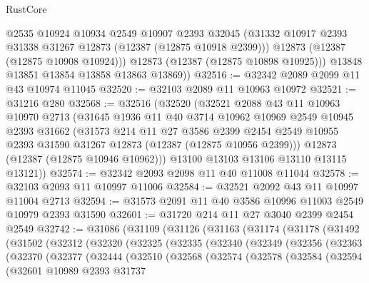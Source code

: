 \begin{lexlean}{RustCore}
\begin{coremodule}
            @2535
            @10924
            @10934
            @2549
            @10907
            @2393
            @32045
            (@31332 @10917 @2393 @31338 @31267 @12873 (@12387 (@12875 @10918 @2399)))
            @12873
            (@12387 (@12875 @10908 @10924)))
          @12873
          (@12387 (@12875 @10898 @10925)))
        @13848
        @13851
        @13854
        @13858
        @13863
        @13869))
@32516 := @32342 @2089 @2099 @11 @43 @10974 @11045
@32520 := @32103 @2089 @11 @10963 @10972
@32521 := @31216 @280
@32568 := @32516
    (@32520
      (@32521
        @2088
        @43
        @11
        @10963
        @10970
        @2713
        (@31645
          @1936
          @11
          @40
          @3714
          @10962
          @10969
          @2549
          @10945
          @2393
          @31662
          (@31573
            @214
            @11
            @27
            @3586
            @2399
            @2454
            @2549
            @10955
            @2393
            @31590
            @31267
            @12873
            (@12387 (@12875 @10956 @2399)))
          @12873
          (@12387 (@12875 @10946 @10962)))
        @13100
        @13103
        @13106
        @13110
        @13115
        @13121))
@32574 := @32342 @2093 @2098 @11 @40 @11008 @11044
@32578 := @32103 @2093 @11 @10997 @11006
@32584 := @32521 @2092 @43 @11 @10997 @11004 @2713
@32594 := @31573 @2091 @11 @40 @3586 @10996 @11003 @2549 @10979 @2393 @31590
@32601 := @31720 @214 @11 @27 @3040 @2399 @2454 @2549
@32742 := @31086
    (@31109
      (@31126
        (@31163
          (@31174
            (@31178
              (@31492
                (@31502
                  (@32312
                    (@32320
                      (@32325
                        (@32335
                          (@32340
                            (@32349
                              (@32356
                                (@32363
                                  (@32370
                                    (@32377
                                      (@32444
                                        (@32510
                                          (@32568
                                            (@32574
                                              (@32578
                                                (@32584
                                                  (@32594
                                                    (@32601
                                                      @10989
                                                      @2393
                                                      @31737

\end{coremodule}
\end{lexlean}
